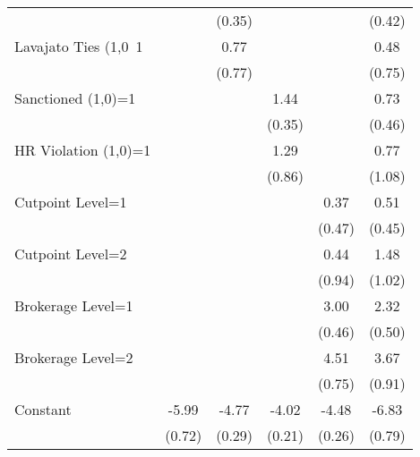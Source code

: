 {\begin{tabular}{l*{5}{c}}
                    &                    &      (0.35)        &                    &                    &      (0.42)        \\
Lavajato Ties (1,0~1&                    &        0.77        &                    &                    &        0.48        \\
                    &                    &      (0.77)        &                    &                    &      (0.75)        \\
Sanctioned (1,0)=1  &                    &                    &        1.44\sym{**}&                    &        0.73        \\
                    &                    &                    &      (0.35)        &                    &      (0.46)        \\
HR Violation (1,0)=1&                    &                    &        1.29        &                    &        0.77        \\
                    &                    &                    &      (0.86)        &                    &      (1.08)        \\
Cutpoint Level=1    &                    &                    &                    &        0.37        &        0.51        \\
                    &                    &                    &                    &      (0.47)        &      (0.45)        \\
Cutpoint Level=2    &                    &                    &                    &        0.44        &        1.48        \\
                    &                    &                    &                    &      (0.94)        &      (1.02)        \\
Brokerage Level=1   &                    &                    &                    &        3.00\sym{**}&        2.32\sym{**}\\
                    &                    &                    &                    &      (0.46)        &      (0.50)        \\
Brokerage Level=2   &                    &                    &                    &        4.51\sym{**}&        3.67\sym{**}\\
                    &                    &                    &                    &      (0.75)        &      (0.91)        \\
Constant            &       -5.99\sym{**}&       -4.77\sym{**}&       -4.02\sym{**}&       -4.48\sym{**}&       -6.83\sym{**}\\
                    &      (0.72)        &      (0.29)        &      (0.21)        &      (0.26)        &      (0.79)        \\


\end{tabular}}
